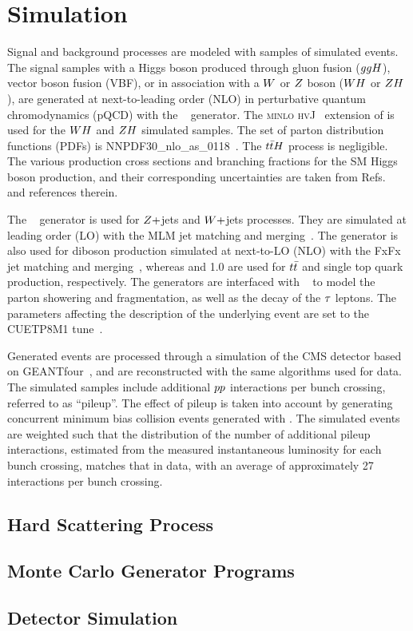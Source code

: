 \chapter{Simulation}

Signal and background processes are modeled with samples of simulated events.
The signal samples with a Higgs boson produced through gluon fusion ($ggH$), vector boson fusion (VBF),
or in association with a $W$ or $Z$ boson ($WH$ or $ZH$), are generated at next-to-leading order (NLO) in perturbative quantum chromodynamics (pQCD) with the ~\cite{Nason:2004rx,Frixione:2007vw, Alioli:2010xd, Alioli:2010xa, Alioli:2008tz} generator. The \textsc{minlo hvJ}~\cite{Luisoni:2013kna} extension of  is used for the $WH$ and $ZH$ simulated samples. The set of parton distribution functions (PDFs) is NNPDF30\_nlo\_as\_0118~\cite{Ball:2011uy}. The $t\bar{t}H$ process is negligible.
The various production cross sections and branching fractions for the SM Higgs boson production, and their corresponding uncertainties are taken from Refs.~\cite{deFlorian:2016spz,Denner:2011mq,Ball:2011mu} and references therein.

The \aMCATNLO~\cite{Alwall:2014hca} generator is used for $Z+$jets and $W+$jets processes. They are simulated at leading order (LO) with the MLM jet matching and merging~\cite{Alwall:2007fs}.
The \aMCATNLO generator is also used for diboson production simulated at next-to-LO (NLO) with the FxFx jet matching and merging~\cite{Frederix:2012ps}, whereas  and 1.0 are used for $t\bar{t}$ and single top quark production, respectively.
The generators are interfaced with  ~\cite{Sjostrand:2014zea} to model the parton showering and fragmentation, as well as the decay of the $\tau$ leptons.
The \PYTHIA parameters affecting the description of the underlying event are set to the {CUETP8M1} tune~\cite{Khachatryan:2015pea}.

Generated events are processed through a simulation of the CMS detector based on
GEANTfour~\cite{Agostinelli:2002hh}, and are reconstructed with the same algorithms used for data.
The simulated samples include additional $pp$ interactions per bunch
crossing, referred to as ``pileup''.
The effect of pileup is taken into account by generating concurrent minimum bias collision events generated with \PYTHIA.
The simulated events are weighted such that the distribution of the number of additional pileup interactions, estimated from the measured instantaneous luminosity for each bunch crossing, matches that in data, with an average of approximately 27 interactions per bunch crossing.

\section{Hard Scattering Process}
\section{Monte Carlo Generator Programs}
\section{Detector Simulation}


